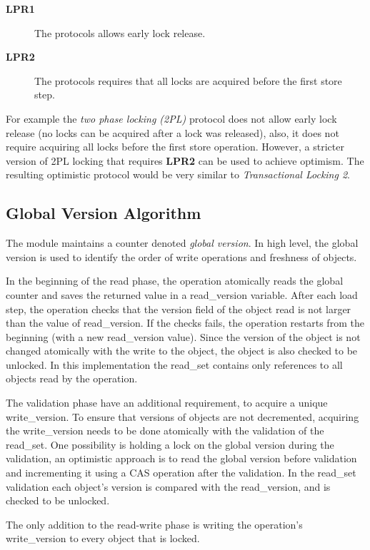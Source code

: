 \documentclass{article}
\newcommand{\code}[1]{\textsf{#1}}
\newcommand{\readV}{\code{read\_version}\xspace}
\newcommand{\readSet}{\code{read\_set}\xspace}
\newcommand{\writeV}{\code{write\_version}\xspace}
\newcommand{\reqI}{\textbf{LPR1}\xspace}
\newcommand{\reqII}{\textbf{LPR2}\xspace}
\begin{document}
\begin{description}
\item[\reqI] The protocols allows early lock release. 
\item[\reqII] The protocols requires that all locks are acquired 
before the first store step.    
\end{description}
    

For example the \emph{two phase locking (2PL)} protocol 
does not allow early lock release (no locks can be acquired after a 
lock was released), also, it does not require acquiring all locks
before the first store operation. However, a stricter version 
of 2PL locking that requires \reqII can be used to achieve optimism. 
The resulting optimistic protocol would be very similar to 
\emph{Transactional Locking 2}\cite{DiceSS2006}.   

\subsection{Global Version Algorithm}
The module maintains a counter denoted \emph{global version}.
In high level, the global version is used to identify 
the order of write operations and freshness of objects.   

In the beginning of the read phase, the operation atomically
reads the global counter and saves the returned value in 
a \readV variable. After each load step, the
operation checks that the version field of the object read
is not larger than the value of \readV. If the checks fails,
the operation restarts from the beginning 
(with a new \readV value). Since the version of the object 
is not changed atomically with the write to the object, 
the object is also checked to be unlocked. 
In this implementation the \readSet contains only 
references to all objects read by the operation.
 
The validation phase have an 
additional  requirement, to acquire a unique \writeV. 
To ensure that versions of objects are not decremented, 
acquiring the \writeV needs to be done atomically with 
the validation of the \readSet. One possibility is holding a
lock on the global version during the validation, 
an optimistic approach is to read the global version 
before validation and incrementing it using a CAS 
operation after the validation. In the \readSet validation 
each object's version is compared with the \readV, 
and is checked to be unlocked. 

The only addition to the read-write phase is writing the 
operation's \writeV to every object that is locked. 
\end{document}
